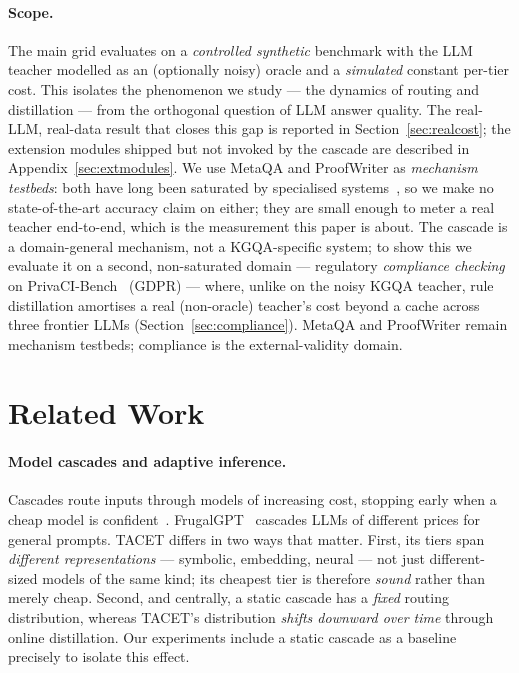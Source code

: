 \documentclass[11pt]{article}
\theoremstyle{plain}
\begin{document}
\paragraph{Scope.} The main grid evaluates on a \emph{controlled synthetic}
benchmark with the LLM teacher modelled as an (optionally noisy) oracle and a
\emph{simulated} constant per-tier cost. This isolates the phenomenon we
study --- the dynamics of routing and distillation --- from the orthogonal
question of LLM answer quality. The real-LLM, real-data result that closes
this gap is reported in Section~\ref{sec:realcost}; the extension modules
shipped but not invoked by the cascade are described in
Appendix~\ref{sec:extmodules}. We use MetaQA and ProofWriter as
\emph{mechanism testbeds}: both have long been saturated by specialised
systems~\citep{saxena2020embedkgqa,tafjord2021proofwriter}, so we make no
state-of-the-art accuracy claim on either; they are small enough to meter a
real teacher end-to-end, which is the measurement this paper is about.
The cascade is a domain-general mechanism, not a KGQA-specific system; to
show this we evaluate it on a second, non-saturated domain --- regulatory
\emph{compliance checking} on PrivaCI-Bench~\citep{privacibench2025} (GDPR) ---
where, unlike on the noisy KGQA teacher, rule distillation amortises a real
(non-oracle) teacher's cost beyond a cache across three frontier LLMs
(Section~\ref{sec:compliance}). MetaQA and ProofWriter remain mechanism
testbeds; compliance is the external-validity domain.

\section{Related Work}
\label{sec:related}

\paragraph{Model cascades and adaptive inference.} Cascades route inputs
through models of increasing cost, stopping early when a cheap model is
confident~\citep{viswanathan2019cascade}. FrugalGPT~\citep{chen2023frugalgpt}
cascades LLMs of different prices for general prompts. TACET differs in
two ways that matter. First, its tiers span \emph{different
representations} --- symbolic, embedding, neural --- not just different-sized
models of the same kind; its cheapest tier is therefore \emph{sound} rather
than merely cheap. Second, and centrally, a static cascade has a
\emph{fixed} routing distribution, whereas TACET's distribution
\emph{shifts downward over time} through online distillation. Our
experiments include a static cascade as a baseline precisely to isolate
this effect.
\end{document}
